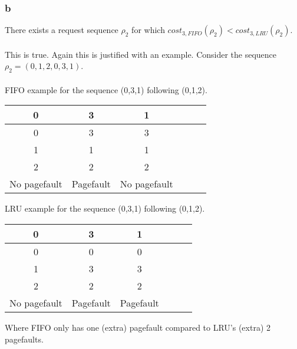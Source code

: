\documentclass[12pt]{article}
\begin{document}
\subsubsection{b}
There exists a request sequence $\rho_2$ for which $cost_{3,FIFO}(\rho_2) < cost_{3,LRU}(\rho_2)$.\\
\\
This is true. Again this is justified with an example. Consider the sequence $\rho_2=(0,1,2,0,3,1)$.
\\
\\
FIFO example for the sequence (0,3,1) following (0,1,2).\\
\begin{center}
\begin{tabular}{|c|c|c|c|c|c|}
\hline 
0 & 3 & 1 \\ 
\hline 
0 & 3 & 3 \\ 
1 & 1 & 1 \\ 
2 & 2 & 2 \\ 
\hline
No pagefault & Pagefault & No pagefault \\
\hline
\end{tabular}
\end{center}
$ $
\\
LRU example for the sequence (0,3,1) following (0,1,2).\\
\begin{center}
\begin{tabular}{|c|c|c|c|c|c|}
\hline 
0 & 3 & 1 \\ 
\hline 
0 & 0 & 0 \\ 
1 & 3 & 3 \\ 
2 & 2 & 2 \\ 
\hline
No pagefault & Pagefault & Pagefault \\
\hline
\end{tabular}
\end{center}
$ $
\\
Where FIFO only has one (extra) pagefault compared to LRU's (extra) 2 pagefaults.
\end{document}

